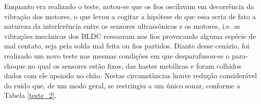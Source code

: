 

Enquanto era realizado o teste, notou-se que os fios oscilavam em decorrência da vibração dos motores, o que levou a cogitar a hipótese de que essa 
seria de fato a natureza da interferência entre os sensores ultrassônicos e os motores, i.e. as vibrações mecânicas dos BLDC ressoavam nos fios 
provocando alguma espécie de mal contato, seja pela solda mal feita ou fios partidos.
Diante desse cenário, foi realizado um novo teste nas mesmas condições em que desparafusou-se o para-choque no qual os sensores estão fixos, das 
hastes metálicas e foram colhidos dados  com ele apoiado no chão. Nestas circunstâncias houve redução considerável do ruído que, de um modo geral, se 
restringiu a um único sonar, conforme a Tabela \ref{teste_2}.


